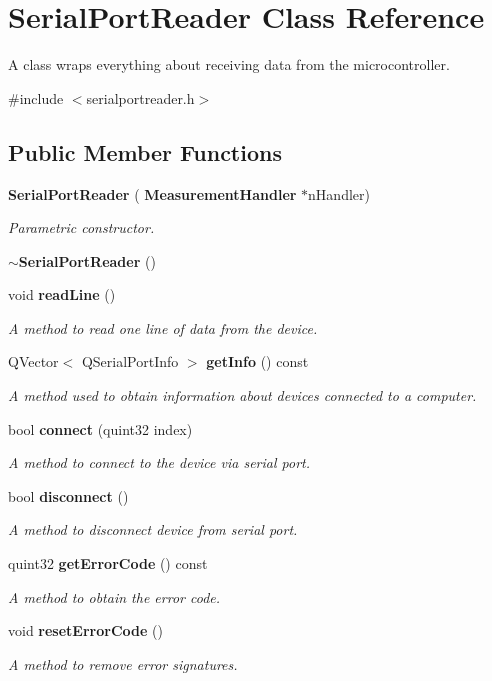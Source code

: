 \section{Serial\+Port\+Reader Class Reference}
\label{class_serial_port_reader}


A class wraps everything about receiving data from the microcontroller.  




{\ttfamily \#include $<$serialportreader.\+h$>$}

\subsection*{Public Member Functions}
\begin{DoxyCompactItemize}
\item 
\textbf{ Serial\+Port\+Reader} (\textbf{ Measurement\+Handler} $\ast$n\+Handler)
\begin{DoxyCompactList}\small\item\em Parametric constructor. \end{DoxyCompactList}\item 
\textbf{ $\sim$\+Serial\+Port\+Reader} ()
\item 
void \textbf{ read\+Line} ()
\begin{DoxyCompactList}\small\item\em A method to read one line of data from the device. \end{DoxyCompactList}\item 
Q\+Vector$<$ Q\+Serial\+Port\+Info $>$ \textbf{ get\+Info} () const
\begin{DoxyCompactList}\small\item\em A method used to obtain information about devices connected to a computer. \end{DoxyCompactList}\item 
bool \textbf{ connect} (quint32 index)
\begin{DoxyCompactList}\small\item\em A method to connect to the device via serial port. \end{DoxyCompactList}\item 
bool \textbf{ disconnect} ()
\begin{DoxyCompactList}\small\item\em A method to disconnect device from serial port. \end{DoxyCompactList}\item 
quint32 \textbf{ get\+Error\+Code} () const
\begin{DoxyCompactList}\small\item\em A method to obtain the error code. \end{DoxyCompactList}\item 
void \textbf{ reset\+Error\+Code} ()
\begin{DoxyCompactList}\small\item\em A method to remove error signatures. \end{DoxyCompactList}\end{DoxyCompactItemize}
